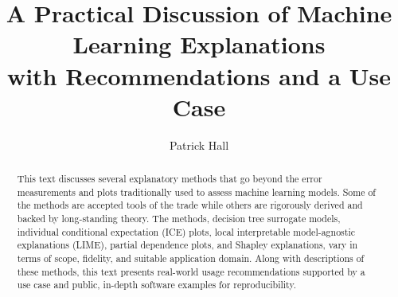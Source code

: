 \documentclass[sigconf, review]{acmart}
\begin{document}
%
\title[Machine Learning Explanations]{A Practical Discussion of Machine Learning Explanations\\ with Recommendations and a Use Case}

%
\author{Patrick Hall}

\renewcommand{\shortauthors}{Hall, Patrick}

%
\begin{abstract}
This text discusses several explanatory methods that go beyond the error measurements and plots 	traditionally used to assess machine learning models. Some of the methods are accepted tools of the trade while others are rigorously derived and backed by long-standing theory. The methods, decision tree surrogate models, individual conditional expectation (ICE) plots, local interpretable model-agnostic explanations (LIME), partial dependence plots, and Shapley explanations, vary in terms of scope, fidelity, and suitable application domain.  Along with descriptions of these methods, this text presents real-world usage recommendations supported by a use case and public, in-depth software examples for reproducibility.
\end{abstract}
\end{document}
